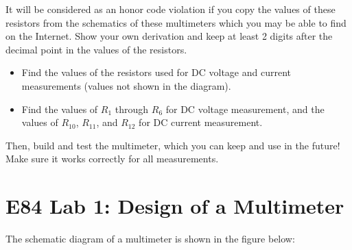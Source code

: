 \begin{itemize}
  It will be considered as an honor code violation if you copy the values of 
  these resistors from the schematics of these multimeters which you may be 
  able to find on the Internet. Show your own derivation and keep at least 2
  digits after the decimal point in the values of the resistors.
  

  \begin{itemize}
  \item {}

    Find the values of the resistors used for DC voltage and current measurements
    (values not shown in the diagram).

  \item {}

    Find the values of $R_1$ through $R_6$ for DC voltage measurement,
    and the values of $R_{10}$, $R_{11}$, and $R_{12}$ for DC current measurement.
  \end{itemize}
  
  Then, build and test the multimeter, which you can keep and use in the future!
  Make sure it works correctly for all measurements.

\end{itemize}



\section*{E84 Lab 1: Design of a Multimeter}




The schematic diagram of a multimeter is shown in the figure below:

